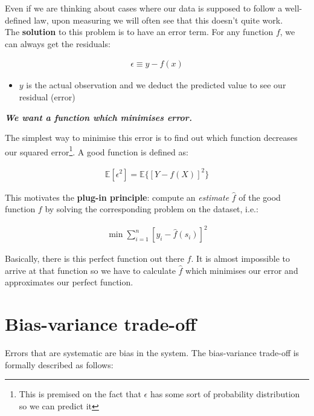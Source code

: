 \documentclass[
]{report}
\providecommand{\tightlist}{%
  \setlength{\itemsep}{0pt}\setlength{\parskip}{0pt}}
\renewenvironment{quote}{
	\bigskip\begin{mdframed}[
			skipabove=\topskip,
			skipbelow=\topskip,
			backgroundcolor=quoteshadecolor,
			leftmargin=0.5cm,
			rightmargin=0.5cm,
			topline=false,
			rightline=false,
			bottomline=false,
			nobreak=true,
		]\itshape%
		}{
	\end{mdframed}
}
\theoremstyle{definition}
\theoremstyle{definition}
\theoremstyle{definition}
\theoremstyle{definition}
\theoremstyle{remark}
\begin{document}
Even if we are thinking about cases where our data is supposed to follow a
well-defined law, upon measuring we will often see that this doesn't quite
work.\\
The \textbf{solution} to this problem is to have an error term. For any function
\(f\), we can always get the residuals:

\begin{align*}
  \epsilon\equiv y - f(x)
\end{align*}

\begin{itemize}
\tightlist
\item
  \(y\) is the actual observation and we deduct the predicted value to see our
  residual (error)
\end{itemize}

\textbf{\emph{We want a function which minimises error.}}

The simplest way to minimise this error is to find out which function decreases
our squared error\footnote{This is premised on the fact that \(\epsilon\) has some sort
  of probability distribution so we can predict it}. A good function is defined
as:

\begin{align*}
  \mathbb{E}[\epsilon^2] = \mathbb{E}\{[Y - f(X)]^2\}
\end{align*}

This motivates the \textbf{plug-in principle}: compute an \emph{estimate} \(\hat{f}\) of
the good function \(f\) by solving the corresponding problem on the dataset,
i.e.:

\begin{align*}
  \min\sum_{i = 1}^{n}\left[y_{i} - \hat{f}(s_{i})\right]^{2}
\end{align*}

\begin{quote}
Basically, there is this perfect function out there \(f\). It is almost
impossible to arrive at that function so we have to calculate \(\hat{f}\) which
minimises our error and approximates our perfect function.
\end{quote}

\hypertarget{bias-variance-trade-off}{%
\section{Bias-variance trade-off}\label{bias-variance-trade-off}}

Errors that are systematic are bias in the system. The bias-variance trade-off
is formally described as follows:
\end{document}

